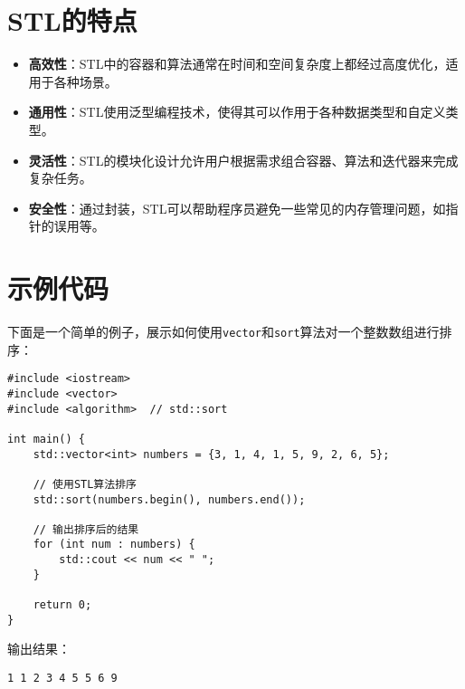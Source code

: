 \documentclass{article}
\begin{document}
\section{STL的特点}

\begin{itemize}
    \item \textbf{高效性}：STL中的容器和算法通常在时间和空间复杂度上都经过高度优化，适用于各种场景。
    \item \textbf{通用性}：STL使用泛型编程技术，使得其可以作用于各种数据类型和自定义类型。
    \item \textbf{灵活性}：STL的模块化设计允许用户根据需求组合容器、算法和迭代器来完成复杂任务。
    \item \textbf{安全性}：通过封装，STL可以帮助程序员避免一些常见的内存管理问题，如指针的误用等。
\end{itemize}

\section{示例代码}

下面是一个简单的例子，展示如何使用\texttt{vector}和\texttt{sort}算法对一个整数数组进行排序：

\begin{verbatim}
#include <iostream>
#include <vector>
#include <algorithm>  // std::sort

int main() {
    std::vector<int> numbers = {3, 1, 4, 1, 5, 9, 2, 6, 5};
    
    // 使用STL算法排序
    std::sort(numbers.begin(), numbers.end());
    
    // 输出排序后的结果
    for (int num : numbers) {
        std::cout << num << " ";
    }
    
    return 0;
}
\end{verbatim}

输出结果：

\begin{verbatim}
1 1 2 3 4 5 5 6 9
\end{verbatim}
\end{document}
